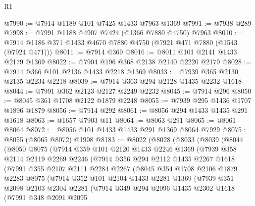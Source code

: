 \begin{lexlean}{R1}
\begin{coremodule}
@7990 := @7914 @1189 @101 @7425 @1433 @7963 @1369
@7991 := @7938 @289
@7998 := @7991 @1188 @4907 @7424 (@1366 @7880 @4750) @7963
@8010 := @7914 @1186 @371 @1433 @4670 @7880 @4750 (@7921 @471 @7880 (@1543 (@7924 @471)))
@8011 := @7914 @369
@8016 := @8011 @101 @2141 @1433 @2179 @1369
@8022 := @7904 @196 @368 @2138 @2140 @2220 @2179
@8028 := @7914 @366 @101 @2136 @1433 @2218 @1369
@8033 := @7939 @365 @2130 @2135 @2234 @2218
@8039 := @7914 @363 @294 @2128 @1435 @2232 @1618
@8044 := @7991 @362 @2123 @2127 @2249 @2232
@8045 := @7914 @296
@8050 := @8045 @361 @1708 @2122 @1879 @2248
@8055 := @7939 @295 @1436 @1707 @1896 @1879
@8056 := @7914 @292
@8061 := @8056 @294 @1433 @1435 @291 @1618
@8063 := @1657 @7903 @11
@8064 := @8063 @291
@8065 := @8061 @8064
@8072 := @8056 @101 @1433 @1433 @291 @1369 @8064 @7929
@8075 := @8055 (@8065 @8072) @1908
@8183 := @8022
    (@8028
      (@8033
        (@8039
          (@8044
            (@8050
              @8075
              (@7914
                @359
                @101
                @2120
                @1433
                @2246
                @1369
                (@7939
                  @358
                  @2114
                  @2119
                  @2269
                  @2246
                  (@7914
                    @356
                    @294
                    @2112
                    @1435
                    @2267
                    @1618
                    (@7991
                      @355
                      @2107
                      @2111
                      @2284
                      @2267
                      (@8045
                        @354
                        @1708
                        @2106
                        @1879
                        @2283
                        @8075
                        (@7914
                          @352
                          @101
                          @2104
                          @1433
                          @2281
                          @1369
                          (@7939
                            @351
                            @2098
                            @2103
                            @2304
                            @2281
                            (@7914
                              @349
                              @294
                              @2096
                              @1435
                              @2302
                              @1618
                              (@7991
                                @348
                                @2091
                                @2095

\end{coremodule}
\end{lexlean}
